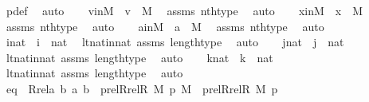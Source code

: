 \begin{isabellebody}
\ p{\isacharunderscore}{\kern0pt}def\ \isamarkupfalse%
\ auto\isanewline
\isanewline
\ \ \isamarkupfalse%
\ vinM\ {\isacharcolon}{\kern0pt}\ {\isachardoublequoteopen}v\ {\isasymin}\ M{\isachardoublequoteclose}\ \isamarkupfalse%
\ assms\ nth{\isacharunderscore}{\kern0pt}type\ \isamarkupfalse%
\ auto\isanewline
\ \ \isamarkupfalse%
\ xinM\ {\isacharcolon}{\kern0pt}\ {\isachardoublequoteopen}x\ {\isasymin}\ M{\isachardoublequoteclose}\ \isamarkupfalse%
\ assms\ nth{\isacharunderscore}{\kern0pt}type\ \isamarkupfalse%
\ auto\isanewline
\ \ \isamarkupfalse%
\ ainM\ {\isacharcolon}{\kern0pt}\ {\isachardoublequoteopen}a\ {\isasymin}\ M{\isachardoublequoteclose}\ \isamarkupfalse%
\ assms\ nth{\isacharunderscore}{\kern0pt}type\ \isamarkupfalse%
\ auto\isanewline
\ \ \isamarkupfalse%
\ inat\ {\isacharcolon}{\kern0pt}\ {\isachardoublequoteopen}i\ {\isasymin}\ nat{\isachardoublequoteclose}\ \isamarkupfalse%
\ lt{\isacharunderscore}{\kern0pt}nat{\isacharunderscore}{\kern0pt}in{\isacharunderscore}{\kern0pt}nat\ assms\ length{\isacharunderscore}{\kern0pt}type\ \isamarkupfalse%
\ auto\isanewline
\ \ \isamarkupfalse%
\ jnat\ {\isacharcolon}{\kern0pt}\ {\isachardoublequoteopen}j\ {\isasymin}\ nat{\isachardoublequoteclose}\ \isamarkupfalse%
\ lt{\isacharunderscore}{\kern0pt}nat{\isacharunderscore}{\kern0pt}in{\isacharunderscore}{\kern0pt}nat\ assms\ length{\isacharunderscore}{\kern0pt}type\ \isamarkupfalse%
\ auto\isanewline
\ \ \isamarkupfalse%
\ knat\ {\isacharcolon}{\kern0pt}\ {\isachardoublequoteopen}k\ {\isasymin}\ nat{\isachardoublequoteclose}\ \isamarkupfalse%
\ lt{\isacharunderscore}{\kern0pt}nat{\isacharunderscore}{\kern0pt}in{\isacharunderscore}{\kern0pt}nat\ assms\ length{\isacharunderscore}{\kern0pt}type\ \isamarkupfalse%
\ auto\isanewline
\isanewline
\ \ \isamarkupfalse%
\ eq{}\ {\isacharcolon}{\kern0pt}\ {\isachardoublequoteopen}Rrel{\isacharparenleft}{\kern0pt}{\isasymlambda}a\ b{\isachardot}{\kern0pt}\ {\isasymlangle}a{\isacharcomma}{\kern0pt}\ b{\isasymrangle}\ {\isasymin}\ prel{\isacharparenleft}{\kern0pt}Rrel{\isacharparenleft}{\kern0pt}R{\isacharcomma}{\kern0pt}\ M{\isacharparenright}{\kern0pt}{\isacharcomma}{\kern0pt}\ p{\isacharparenright}{\kern0pt}{\isacharcomma}{\kern0pt}\ M{\isacharparenright}{\kern0pt}\ {\isacharequal}{\kern0pt}\ prel{\isacharparenleft}{\kern0pt}Rrel{\isacharparenleft}{\kern0pt}R{\isacharcomma}{\kern0pt}\ M{\isacharparenright}{\kern0pt}{\isacharcomma}{\kern0pt}\ p{\isacharparenright}{\kern0pt}{\isachardoublequoteclose}\isanewline

\end{isabellebody}
